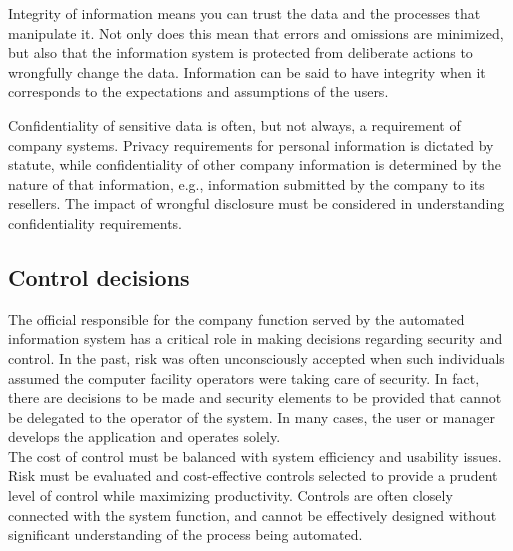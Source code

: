 \begin{htmllist}
    
    Integrity of information means you can trust the data and the processes
    that manipulate it. Not only does this mean that errors and omissions
    are minimized, but also that the information system is protected from
    deliberate actions to wrongfully change the data. Information can be
    said to have integrity when it corresponds to the expectations and
    assumptions of the users.

    
    Confidentiality of sensitive data is often, but not always, a
    requirement of company systems. Privacy requirements for personal
    information is dictated by statute, while confidentiality of other
    company information is determined by the nature of that information,
    e.g., information submitted by the company to its resellers. The impact
    of wrongful disclosure must be considered in understanding
    confidentiality requirements.
\end{htmllist}

\subsection{Control decisions}
The official responsible for the company function served by the
automated information system has a critical role in making decisions
regarding security and control. In the past, risk was often
unconsciously accepted when such individuals assumed the computer
facility operators were taking care of security. In fact, there are
decisions to be made and security elements to be provided that cannot
be delegated to the operator of the system. In many cases, the user or
manager develops the application and operates solely.\\

The cost of control must be balanced with system efficiency and
usability issues. Risk must be evaluated and cost-effective controls
selected to provide a prudent level of control while maximizing
productivity. Controls are often closely connected with the system
function, and cannot be effectively designed without significant
understanding of the process being automated.


